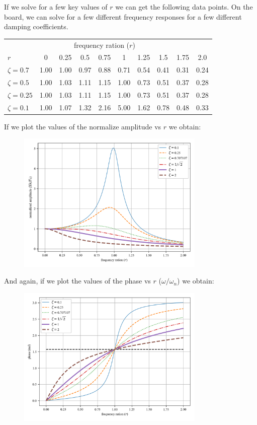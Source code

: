 \documentclass[12pt,letter]{article}
\numberwithin{ex}{section} %
\begin{document}
			If we solve for a few key values of $r$ we can get the following data points. On the board, we can solve for a few different frequency responses for a few different damping coefficients. 
			\begin{table}[H]
				\centering
				\begin{tabular}{@{}lccccccccc@{}}
				\toprule
				 & & \multicolumn{5}{c}{frequency ration ($r$)} \\ 
				$r$ & 0 & 0.25& 0.5& 0.75& 1& 1.25& 1.5& 1.75& 2.0 \\ \midrule
				$\zeta=0.7$	&	1.00&  1.00	&   0.97&	0.88&	0.71&	0.54&	0.41&	0.31 & 0.24\\
				$\zeta=0.5$	&	1.00&	1.03&	1.11&	1.15&	1.00&	0.73&	0.51&	0.37 & 0.28\\ 
				$\zeta=0.25$	&	1.00&	1.03&	1.11&	1.15&	1.00&	0.73&	0.51&	0.37 & 0.28 \\ 
				$\zeta=0.1$	&	1.00&	1.07&	1.32&	2.16&	5.00&	1.62&	0.78&	0.48 & 0.33 \\ \bottomrule
				\end{tabular}
			\end{table}
			If we plot the values of the normalize amplitude vs $r$ we obtain:
			\begin{figure}[H]
				\centering
				\includegraphics[width=0.8\textwidth]{../Figures/frequency_response_amplitude.png}
			\end{figure}			
			And again, if we plot the values of the phase vs $r$ ($\omega/\omega_n$) we obtain:
			\begin{figure}[H]
				\centering
				\includegraphics[width=0.8\textwidth]{../Figures/frequency_response_phase.png}
			\end{figure}				
\end{document}
